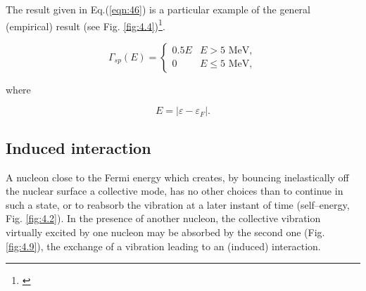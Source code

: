 The result given in Eq.(\ref{eqn:46}) is a particular example of the general (empirical) result (see Fig. \ref{fig:4.4})\footnote{\cite{Bertsch:83}}.

\begin{equation}
\Gamma_{sp} (E) =
  \begin{cases}
    0.5 E & \text{$E>5$ MeV}, \\
    0     & \text{$E \leq 5$ MeV},
  \end{cases}
\label{eqn:47}
\end{equation}

\noindent where

\begin{equation}
E = |\varepsilon - \varepsilon_F| .
\label{eqn:48}
\end{equation}

\subsection{Induced interaction}

A nucleon close to the Fermi energy which creates, by bouncing inelastically off the nuclear surface a collective mode, has no other choices than to continue in such a state, or to reabsorb the vibration at a later instant of time (self--energy, Fig. \ref{fig:4.2}). In the presence of another nucleon, the collective vibration virtually excited by one nucleon may be absorbed by the second one (Fig.\ref{fig:4.9}), the exchange of a vibration leading to an (induced) interaction.

